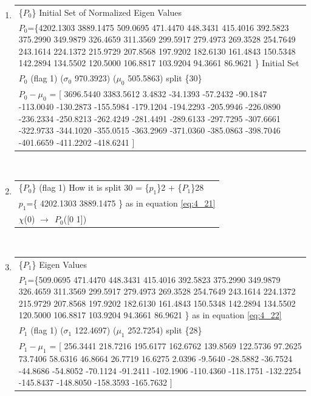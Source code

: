 
\begin{center} 
 \begin{enumerate} 
\item \begin{tabular}{ | p{15cm} | }\hline\{$P_{0}$\} Initial Set of Normalized Eigen Values \\ 
{$P_{0}$}=\{4202.1303 3889.1475 509.0695 471.4470 448.3431 415.4016 392.5823 375.2990 349.9879 326.4659 311.3569 299.5917 279.4973 269.3528 254.7649 243.1614 224.1372 215.9729 207.8568 197.9202 182.6130 161.4843 150.5348 142.2894 134.5502 120.5000 106.8817 103.9204 94.3661 86.9621 \} Initial Set \\ 
            $P_{0}$ (flag 1) ($\sigma_{0}$ 970.3923) ($\mu_{0}$ 505.5863) split \{30\} \\ 
$P_{0}-\mu_{0}$ = [ 3696.5440 3383.5612 3.4832 -34.1393 -57.2432 -90.1847 -113.0040 -130.2873 -155.5984 -179.1204 -194.2293 -205.9946 -226.0890 -236.2334 -250.8213 -262.4249 -281.4491 -289.6133 -297.7295 -307.6661 -322.9733 -344.1020 -355.0515 -363.2969 -371.0360 -385.0863 -398.7046 -401.6659 -411.2202 -418.6241 ]  \\ 
\hline 
\end{tabular}\\ \vspace{3mm}

\item \begin{tabular}{ | p{15cm} | }\hline\{$P_{0}$\} 
            (flag 1) How it is split 30 = \{$p_{1}$\}2 + \{$P_{1}$\}28\\ 
$p_{1}$=\{ 4202.1303 3889.1475 \} as in equation \ref{eq:4_21} \\ 
            $\chi$(0) $\longrightarrow~~P_{0}$([0 1]) \\ 
\hline 
\end{tabular}\\ \vspace{3mm}

\item \begin{tabular}{ | p{15cm} | }\hline\{$P_{1}$\} Eigen Values \\ 
{$P_{1}$}=\{509.0695 471.4470 448.3431 415.4016 392.5823 375.2990 349.9879 326.4659 311.3569 299.5917 279.4973 269.3528 254.7649 243.1614 224.1372 215.9729 207.8568 197.9202 182.6130 161.4843 150.5348 142.2894 134.5502 120.5000 106.8817 103.9204 94.3661 86.9621 \} as in equation \ref{eq:4_22} \\ 
            $P_{1}$ (flag 1) ($\sigma_{1}$ 122.4697) ($\mu_{1}$ 252.7254) split \{28\} \\ 
$P_{1}-\mu_{1}$ = [ 256.3441 218.7216 195.6177 162.6762 139.8569 122.5736 97.2625 73.7406 58.6316 46.8664 26.7719 16.6275 2.0396 -9.5640 -28.5882 -36.7524 -44.8686 -54.8052 -70.1124 -91.2411 -102.1906 -110.4360 -118.1751 -132.2254 -145.8437 -148.8050 -158.3593 -165.7632 ]  \\ 
\hline 
\end{tabular}\\ \vspace{3mm}


\end{enumerate}
\end{center}
